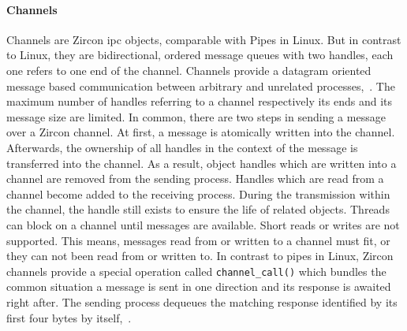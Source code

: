 %

\paragraph{Channels}
Channels are Zircon \ac{ipc} objects, comparable with Pipes in Linux.
But in contrast to Linux, they are bidirectional, ordered message queues with two handles, each one refers to one end of the channel.
Channels provide a datagram oriented message based communication between arbitrary and unrelated processes\cite{zircon-channel},~\cite{zircon-concepts}.
The maximum number of handles referring to a channel respectively its ends and its message size are limited.
In common, there are two steps in sending a message over a Zircon channel.
At first, a message is atomically written into the channel.
Afterwards, the ownership of all handles in the context of the message is transferred into the channel\cite{zircon-channel}.
As a result, object handles which are written into a channel are removed from the sending process.
Handles which are read from a channel become added to the receiving process.
During the transmission within the channel, the handle still exists to ensure the life of related objects\cite{zircon-concepts}.
Threads can block on a channel until messages are available.
Short reads or writes are not supported.
This means, messages read from or written to a channel must fit, or they can not been read from or written to.
In contrast to pipes in Linux, Zircon channels provide a special operation called \texttt{channel\_call()} which bundles the common situation a message is sent in one direction and its response is awaited right after.
The sending process dequeues the matching response identified by its first four bytes by itself\cite{zircon-concepts},~\cite{zircon-channel}.

